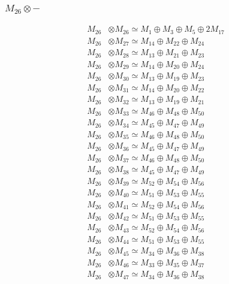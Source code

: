 \subsubsection{$ M_{26}\otimes -$}
\begin{align*}
M_{26} &\otimes M_{26} \simeq M_{1} \oplus M_{3} \oplus M_{5} \oplus 2M_{17} \\
M_{26} &\otimes M_{27} \simeq M_{14} \oplus M_{22} \oplus M_{24} \\
M_{26} &\otimes M_{28} \simeq M_{13} \oplus M_{21} \oplus M_{23} \\
M_{26} &\otimes M_{29} \simeq M_{14} \oplus M_{20} \oplus M_{24} \\
M_{26} &\otimes M_{30} \simeq M_{13} \oplus M_{19} \oplus M_{23} \\
M_{26} &\otimes M_{31} \simeq M_{14} \oplus M_{20} \oplus M_{22} \\
M_{26} &\otimes M_{32} \simeq M_{13} \oplus M_{19} \oplus M_{21} \\
M_{26} &\otimes M_{33} \simeq M_{46} \oplus M_{48} \oplus M_{50} \\
M_{26} &\otimes M_{34} \simeq M_{45} \oplus M_{47} \oplus M_{49} \\
M_{26} &\otimes M_{35} \simeq M_{46} \oplus M_{48} \oplus M_{50} \\
M_{26} &\otimes M_{36} \simeq M_{45} \oplus M_{47} \oplus M_{49} \\
M_{26} &\otimes M_{37} \simeq M_{46} \oplus M_{48} \oplus M_{50} \\
M_{26} &\otimes M_{38} \simeq M_{45} \oplus M_{47} \oplus M_{49} \\
M_{26} &\otimes M_{39} \simeq M_{52} \oplus M_{54} \oplus M_{56} \\
M_{26} &\otimes M_{40} \simeq M_{51} \oplus M_{53} \oplus M_{55} \\
M_{26} &\otimes M_{41} \simeq M_{52} \oplus M_{54} \oplus M_{56} \\
M_{26} &\otimes M_{42} \simeq M_{51} \oplus M_{53} \oplus M_{55} \\
M_{26} &\otimes M_{43} \simeq M_{52} \oplus M_{54} \oplus M_{56} \\
M_{26} &\otimes M_{44} \simeq M_{51} \oplus M_{53} \oplus M_{55} \\
M_{26} &\otimes M_{45} \simeq M_{34} \oplus M_{36} \oplus M_{38} \\
M_{26} &\otimes M_{46} \simeq M_{33} \oplus M_{35} \oplus M_{37} \\
M_{26} &\otimes M_{47} \simeq M_{34} \oplus M_{36} \oplus M_{38} \\

\end{align*}
